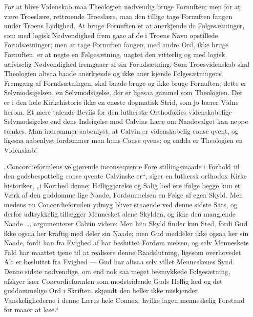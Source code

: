 \documentclass[12pt]{book}
\newcommand{\opage}[1]{\marginnote{\footnotesize\textit{[#1]}}}
\begin{document}
For at blive Videnskab maa Theologien nødvendig
bruge Fornuften; men for at være Troeslære, rettroende
Troeslære, maa den tillige tage Fornuften fangen under
Troens Lydighed. At bruge Fornuften er at anerkjende
de Følgesætninger, som med logisk Nødvendighed frem\-%
gaae af de i Troens Navn opstillede Forudsætninger;
men at tage Fornuften fangen, med andre Ord, ikke
bruge Fornuften, er at negte en Følgesætning, uagtet
den vitterlig og med logisk uafviselig Nødvendighed
fremgaaer af sin Forudsætning. Som Troesvidenskab
\opage{246}\setcounter{footnote}{0}%
skal Theologien altsaa baade anerkjende og ikke aner\-%
kjende Følgesætningens Fremgang af Forudsætningen,
skal baade bruge og ikke bruge Fornuften; dette er
Selvmodsigelsen, en Selvmodsigelse, der er ligesaa gammel
som Theologien. Der er i den hele Kirkehistorie ikke
en eneste dogmatisk Strid, som jo bærer Vidne herom.
Et mere talende Beviis for den lutherske Orthodoxies
videnskabelige Selvmodsigelse end dens Indsigelse mod
Calvins Lære om Naadevalget kan neppe tænkes. Man
indrømmer aabenlyst, at Calvin er videnskabelig conse\-%
qvent, og ligesaa aabenlyst fordømmer man hans Conse\-%
qvens; og endda er Theologien en Videnskab!

„Concordieformlens velgjørende inconseqvente Fore\-%
stillingsmaade i Forhold til den gudsbespottelig conse\-%
qvente Calvinske er“, siger en luthersk orthodox Kirke\-%
historiker, „i Korthed denne: Helliggjørelse og Salig\-%
hed ere ifølge begge kun et Værk af den guddomme\-%
lige Naade, Fordømmelsen en Følge af egen Skyld.
Men medens nu Concordieformlen ydmyg bliver staaende
ved denne sidste Sats, og derfor udtrykkelig tillægger
Mennesket alene Skylden, og ikke den manglende
Naade \ldots{}, argumenterer Calvin videre: Men hiin Skyld
finder kun Sted, fordi Gud ikke ogsaa her kraftig med\-%
deler sin Naade; men Gud meddeler ikke ogsaa her sin
Naade, fordi han fra Evighed af har besluttet Fordøm\-%
melsen, og selv Menneskets Fald har maattet tjene til
at realisere denne Raadslutning, ligesom overhovedet
Alt er besluttet fra Evighed --- Gud har altsaa selv
villet Menneskenes Synd. Denne sidste nødvendige, om
end nok saa meget besmykkede Følgesætning, afskyer
især Concordieformlen som modstridende Guds Hellig\-%
hed og det guddommelige Ord i Skriften, skjøndt den
heller ikke miskjender Vanskelighederne i denne Læres
\opage{247}\setcounter{footnote}{0}%
hele Connex, hvilke ingen menneskelig Forstand for\-%
maaer at løse.“
\end{document}
